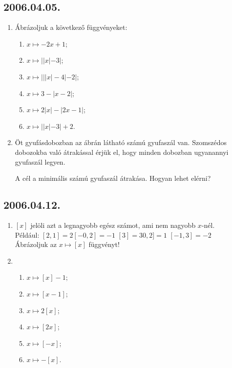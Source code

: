 \documentclass{article}
\newenvironment{abc}{\begin{enumerate}[label=\textit{\alph*})]}{\end{enumerate}}
\begin{document}
\subsection*{2006.04.05.}
\begin{enumerate}
\item Ábrázoljuk a következő függvényeket:
\begin{abc}
\item $x \mapsto -2x+1$;
\item $x \mapsto ||x|-3|$;
\item $x \mapsto |||x|-4|-2|$;
\item $x \mapsto 3-|x-2|$;
\item $x \mapsto 2|x|-|2x-1|$;
\item $x \mapsto ||x|-3|+2$.
\end{abc}
\item Öt gyufásdobozban az ábrán látható számú gyufaszál van.
Szomszédos dobozokba való átrakással érjük el, hogy minden dobozban ugyanannyi gyufaszál legyen.
\begin{center}
\end{center}

\noindent 
 A cél a minimális számú gyufaszál átrakása. Hogyan lehet elérni?

\end{enumerate}

\subsection*{2006.04.12.}
\begin{enumerate}
\item $[x]$ jelöli azt a legnagyobb egész számot, ami nem nagyobb $x$-nél.\\ Például: 
$[2,1]=2$\quad $[-0,2]=-1$ \quad $[3]=3$\quad$0,2]=1$\quad
$[-1,3]=-2$\\
Ábrázoljuk az $x \mapsto [x]$ függvényt!
\item 
\begin{abc}
\item $x \mapsto [x]-1$;
\item $x \mapsto [x-1]$;
\item $x \mapsto 2[x]$;
\item $x \mapsto [2x]$;
\item $x \mapsto [-x]$;
\item $x \mapsto -[x]$.
\end{abc}
\end{enumerate}
\end{document}
